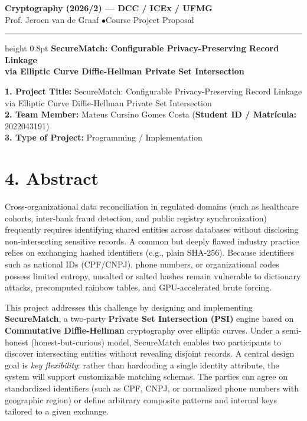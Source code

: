 \documentclass[10pt,a4paper]{article}
\begin{document}
\begin{center}
    {\small \textbf{Cryptography (2026/2) --- DCC / ICEx / UFMG}}\\[0.15em]
    {\footnotesize Prof. Jeroen van de Graaf \quad $\bullet$\quad Course Project Proposal}
    \vspace{0.4em}
    \hrule height 0.8pt
    \vspace{0.5em}
    {\large \textbf{SecureMatch: Configurable Privacy-Preserving Record Linkage\\via Elliptic Curve Diffie-Hellman Private Set Intersection}}
    \vspace{0.3em}
\end{center}

\noindent\textbf{1. Project Title:} SecureMatch: Configurable Privacy-Preserving Record Linkage via Elliptic Curve Diffie-Hellman Private Set Intersection\\[0.25em]
\textbf{2. Team Member:} Mateus Cursino Gomes Costa \quad (\textbf{Student ID / Matrícula:} 2022043191)\\[0.25em]
\textbf{3. Type of Project:} Programming / Implementation

\section*{4. Abstract}
Cross-organizational data reconciliation in regulated domains (such as healthcare cohorts, inter-bank fraud detection, and public registry synchronization) frequently requires identifying shared entities across databases without disclosing non-intersecting sensitive records. A common but deeply flawed industry practice relies on exchanging hashed identifiers (e.g., plain SHA-256). Because identifiers such as national IDs (CPF/CNPJ), phone numbers, or organizational codes possess limited entropy, unsalted or salted hashes remain vulnerable to dictionary attacks, precomputed rainbow tables, and GPU-accelerated brute forcing.

This project addresses this challenge by designing and implementing \textbf{SecureMatch}, a two-party \textbf{Private Set Intersection (PSI)} engine based on \textbf{Commutative Diffie-Hellman} cryptography over elliptic curves. Under a semi-honest (honest-but-curious) model, SecureMatch enables two participants to discover intersecting entities without revealing disjoint records. A central design goal is \emph{key flexibility}: rather than hardcoding a single identity attribute, the system will support customizable matching schemas. The parties can agree on standardized identifiers (such as CPF, CNPJ, or normalized phone numbers with geographic region) or define arbitrary composite patterns and internal keys tailored to a given exchange.
\end{document}

